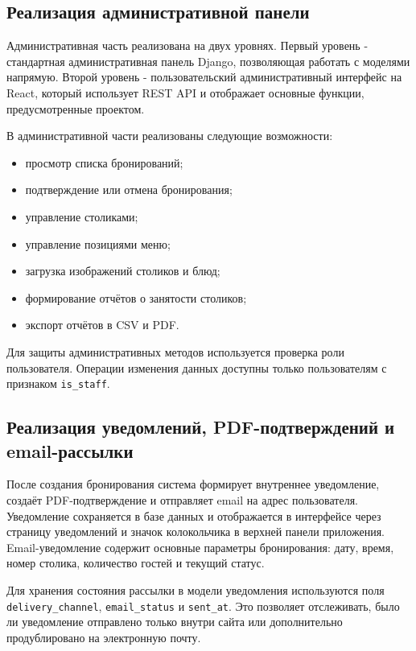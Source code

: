 \subsection{Реализация административной панели}

Административная часть реализована на двух уровнях. Первый уровень - стандартная
административная панель Django, позволяющая работать с моделями напрямую. Второй
уровень - пользовательский административный интерфейс на React, который использует
REST API и отображает основные функции, предусмотренные проектом.

В административной части реализованы следующие возможности:

\begin{itemize}
  \item просмотр списка бронирований;
  \item подтверждение или отмена бронирования;
  \item управление столиками;
  \item управление позициями меню;
  \item загрузка изображений столиков и блюд;
  \item формирование отчётов о занятости столиков;
  \item экспорт отчётов в CSV и PDF.
\end{itemize}

Для защиты административных методов используется проверка роли пользователя.
Операции изменения данных доступны только пользователям с признаком \texttt{is\_staff}.

\subsection{Реализация уведомлений, PDF-подтверждений и email-рассылки}

После создания бронирования система формирует внутреннее уведомление, создаёт
PDF-подтверждение и отправляет email на адрес пользователя. Уведомление сохраняется
в базе данных и отображается в интерфейсе через страницу уведомлений и значок
колокольчика в верхней панели приложения. Email-уведомление содержит основные
параметры бронирования: дату, время, номер столика, количество гостей и текущий
статус.

Для хранения состояния рассылки в модели уведомления используются поля
\texttt{delivery\_channel}, \texttt{email\_status} и \texttt{sent\_at}. Это позволяет
отслеживать, было ли уведомление отправлено только внутри сайта или дополнительно
продублировано на электронную почту.

